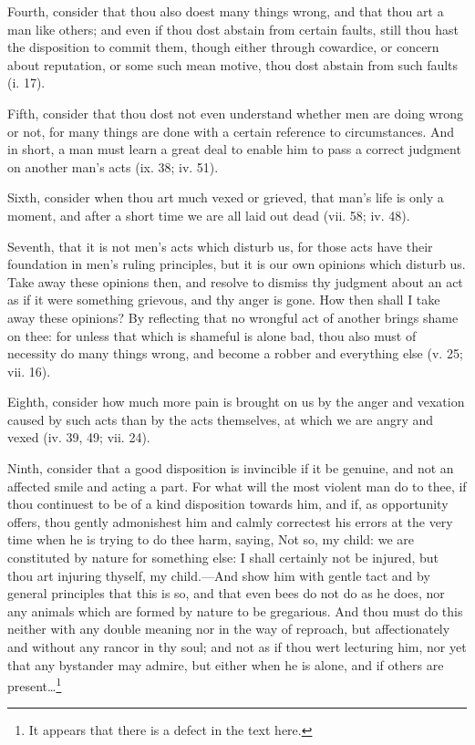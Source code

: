 \begin{enumerate}
Fourth, consider that thou also doest many things wrong, and that thou art a man like others; and even if thou dost abstain from certain faults, still thou hast the disposition to commit them, though either through cowardice, or concern about reputation, or some such mean motive, thou dost abstain from such faults (i. 17).

Fifth, consider that thou dost not even understand whether men are doing wrong or not, for many things are done with a certain reference to circumstances. And in short, a man must learn a great deal to enable him to pass a correct judgment on another man's acts (ix. 38; iv. 51).

Sixth, consider when thou art much vexed or grieved, that man's life is only a moment, and after a short time we are all laid out dead (vii. 58; iv. 48).

Seventh, that it is not men's acts which disturb us, for those acts have their foundation in men's ruling principles, but it is our own opinions which disturb us. Take away these opinions then, and resolve to dismiss thy judgment about an act as if it were something grievous, and thy anger is gone. How then shall I take away these opinions? By reflecting that no wrongful act of another brings shame on thee: for unless that which is shameful is alone bad, thou also must of necessity do many things wrong, and become a robber and everything else (v. 25; vii. 16).

Eighth, consider how much more pain is brought on us by the anger and vexation caused by such acts than by the acts themselves, at which we are angry and vexed (iv. 39, 49; vii. 24).

Ninth, consider that a good disposition is invincible if it be genuine, and not an affected smile and acting a part. For what will the most violent man do to thee, if thou continuest to be of a kind disposition towards him, and if, as opportunity offers, thou gently admonishest him and calmly correctest his errors at the very time when he is trying to do thee harm, saying, Not so, my child: we are constituted by nature for something else: I shall certainly not be injured, but thou art injuring thyself, my child.—And show him with gentle tact and by general principles that this is so, and that even bees do not do as he does, nor any animals which are formed by nature to be gregarious. And thou must do this neither with any double meaning nor in the way of reproach, but affectionately and without any rancor in thy soul; and not as if thou wert lecturing him, nor yet that any bystander may admire, but either when he is alone, and if others are present\ldots \footnote{It appears that there is a defect in the text here.}


\end{enumerate}
